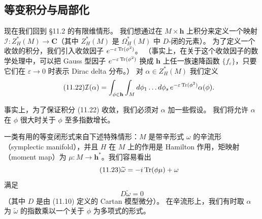 \subsection{等变积分与局部化}

现在我们回到 §11.2 的有限维情形。
我们想通过在 $M\times\mathbf{h}$ 上积分来定义一个映射 $\mathcal{I}:Z^{*}_{H}(M)\to\mathbf{C}$（其中 $Z^{*}_{H}(M)$ 是 $\Omega^{*}_{H}(M)$ 中 $D$-闭的元素）。
为了定义一个收敛的积分，我们引入收敛因子 $e^{-\varepsilon\operatorname{Tr}(\phi^{2})}$。
（事实上，在关于这个收敛因子的数学处理中，可以把 Gauss 型因子 $e^{-\varepsilon\operatorname{Tr}(\phi^{2})}$ 换成 $\mathbf{h}$ 上任一族速降函数 $\{f_{\varepsilon}\}$，只要它们在 $\varepsilon\to0$ 时表示 Dirac delta 分布。）
对 $\alpha\in Z^{*}_{H}(M)$ 我们定义
\begin{equation}
  \tag{11.22}
  \label{eq:11-22}
  \mathcal{I}(\alpha)=\int_{\phi\in\mathbf{h}}\int_{M}d\phi_{1}\dots d\phi_{s}\,
  e^{-\varepsilon\operatorname{Tr}(\phi^{2})}\alpha(\phi).
\end{equation}

事实上，为了保证积分 (11.22) 收敛，我们必须对 $\alpha$ 加一些假设。
我们将允许 $\alpha$ 在 $\phi$ 很大时关于 $\phi$ 至多指数增长。


一类有用的等变闭形式来自下述特殊情形：$M$ 是带辛形式 $\omega$ 的辛流形（symplectic manifold），并且 $H$ 在 $M$ 上的作用是 Hamilton 作用，矩映射（moment map）为 $\mu:M\to\mathbf{h}^{*}$。我们容易看出
\begin{equation}
  \tag{11.23}
  \label{eq:11-23}
  \widetilde\omega=-i\operatorname{Tr}(\phi\mu)+\omega
\end{equation}
满足
\[
D\widetilde\omega=0
\]
（其中 $D$ 是由 (11.10) 定义的 Cartan 模型微分）。
在辛流形上，我们有时取 $\alpha$ 为 $\widetilde\omega$ 的指数乘以一个关于 $\phi$ 为多项式的形式。

